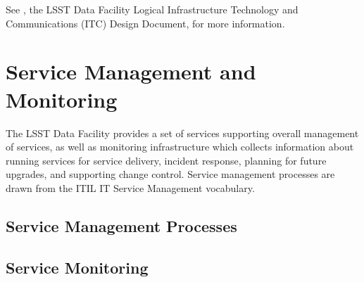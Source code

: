 See , the LSST Data Facility Logical Infrastructure Technology and Communications (ITC) Design Document, for more information.

\section{Service Management and Monitoring}

The LSST Data Facility provides a set of services supporting overall management of services, as well as monitoring infrastructure which collects information about running services for service delivery, incident response, planning for future upgrades, and supporting change control. Service management processes are drawn from the ITIL IT Service Management vocabulary.

\subsection{Service Management Processes}


\subsection{Service Monitoring}


